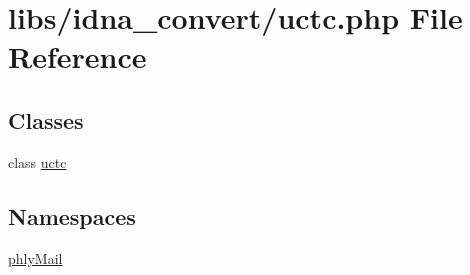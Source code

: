 \hypertarget{uctc_8php}{\section{libs/idna\-\_\-convert/uctc.php File Reference}
\label{uctc_8php}
}
\subsection*{Classes}
\begin{DoxyCompactItemize}
\item 
class \hyperlink{classuctc}{uctc}
\end{DoxyCompactItemize}
\subsection*{Namespaces}
\begin{DoxyCompactItemize}
\item 
\hyperlink{namespacephlyMail}{phly\-Mail}
\end{DoxyCompactItemize}
